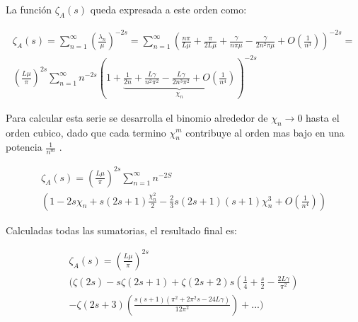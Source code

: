 La función $ \zeta _A (s)$ queda expresada a este orden como:
    
\begin{equation}
\begin{array}{cc}
    \zeta _{A} (s) =  
    \sum _{n=1} ^{\infty} 
    \left( \frac{\lambda _n }{\mu} 
    	\right) ^ {-2 s}  =
    \sum _{n=1} ^{\infty} 
    \left(
	\frac{n \pi}{L \mu} + 
    \frac{\pi}{2 L \mu} +
    \frac{\gamma}{n \pi \mu } -
    \frac{\gamma}{2 n ^2 \pi \mu } +
    O \left(  \frac{1}{n^3} \right) 
    \right) ^{-2 s} = \\
    ( \frac{L \mu }{\pi} ) ^{2s}    
    \sum _{n=1} ^{\infty} 
    n ^{- 2 s} 
    \left(
    1 +     
    \underbrace{
        \frac{1}{2 n} + 
        \frac{L \gamma}{n^2 \pi ^2} -
        \frac{L \gamma}{2 n ^3 \pi ^2} +
        O(\frac{1}{n ^{4}} ) } _{ \chi _n}
    \right ) ^{-2 s}
\end{array}
\end{equation}

Para calcular esta serie se desarrolla el binomio alrededor de $\chi _n \rightarrow{0} $ hasta el orden cubico, dado que  cada termino $\chi _{n} ^{m} $ contribuye al orden mas bajo en una potencia $\frac{1}{n ^m}$ .

\begin{equation}
\begin{array}{c}
\zeta _{A} (s) = 
( \frac{L \mu }{\pi} ) ^{2s}
\sum _{n=1} ^{\infty}
  n  ^{-2 S} \\
(
	1 - 
	2 s \chi _n +  s(2s+1) \frac{\chi _n ^2}{2} - 
	\frac{2}{3} s(2s+1)(s+1) \chi _n ^3  + O( \frac{1}{n ^4}) )

\end{array}
\end{equation}

Calculadas todas las sumatorias, el resultado final es:





\begin{equation}
\begin{array}{c}
    \zeta _A (s) = \left( \frac{L \mu }{\pi} \right) ^{2s} \\
	\Bigg(
		\zeta ( 2 s ) -
		s \zeta ( 2s+1 ) +
		 \zeta (2s +2 ) s \left( \frac{1}{4} + \frac{s}{2} - \frac{2 L  \gamma}{\pi ^2} \right)  \\
		 - \zeta (2s+3) \left(  
							\frac{s(s+1) ( \pi ^2 + 2 \pi ^2 s - 24 L \gamma)}{12 \pi ^2 }
		 					\right) 
		+ ...
		\Bigg)
\end{array}
\end{equation}


